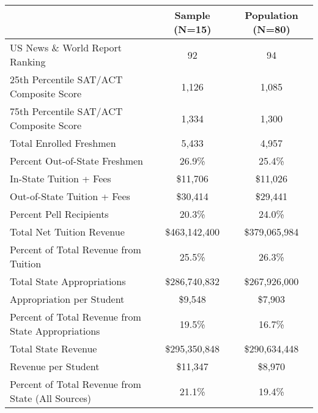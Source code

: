 \begin{tabular*}{\textwidth}{@{\extracolsep{\fill} } lcc}%
&\textbf{Sample} (N=15)&\textbf{Population} (N=80)\\%
\hline%
US News \& World Report Ranking&92&94\\%
25th Percentile SAT/ACT Composite Score&1,126&1,085\\%
75th Percentile SAT/ACT Composite Score&1,334&1,300\\%
Total Enrolled Freshmen&5,433&4,957\\%
Percent Out{-}of{-}State Freshmen&26.9\%&25.4\%\\%
In{-}State Tuition + Fees&\$11,706&\$11,026\\%
Out{-}of{-}State Tuition + Fees&\$30,414&\$29,441\\%
Percent Pell Recipients&20.3\%&24.0\%\\%
Total Net Tuition Revenue&\$463,142,400&\$379,065,984\\%
Percent of Total Revenue from Tuition&25.5\%&26.3\%\\%
Total State Appropriations&\$286,740,832&\$267,926,000\\%
Appropriation per Student&\$9,548&\$7,903\\%
Percent of Total Revenue from State Appropriations&19.5\%&16.7\%\\%
Total State Revenue&\$295,350,848&\$290,634,448\\%
Revenue per Student&\$11,347&\$8,970\\%
Percent of Total Revenue from State (All Sources)&21.1\%&19.4\%\\%
\hline%
\end{tabular*}